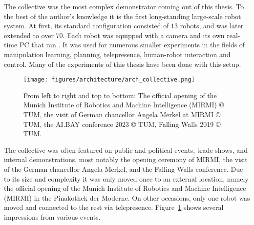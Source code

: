 The collective was the most complex demonstrator coming out of this thesis.
To the best of the author's knowledge it is the first long-standing large-scale robot system.
At first, its standard configuration consisted of $13$ robots, and was later extended to over $70$.
Each robot was equipped with a camera and its own real-time PC that ran \softwareabbr{}.
It was used for numerous smaller experiments in the fields of manipulation learning, planning, telepresence, human-robot interaction and control.
Many of the experiments of this thesis have been done with this setup.

\begin{figure}[ht!]
    \texttt{[image: figures/architecture/arch\_collective.png]}
    \caption{From left to right and top to bottom: The official opening of the Munich Institute of Robotics and Machine Intelligence (MIRMI) \copyright{} TUM, the visit of German chancellor Angela Merkel at MIRMI \copyright{} TUM, the AI.BAY conference 2023 \copyright{} TUM, Falling Walls 2019 \copyright{} TUM.}\label{fig:architecture:learning:collective}
\end{figure}

The collective was often featured on public and political events, trade shows, and internal demonstrations, most notably the opening ceremony of MIRMI, the visit of the German chancellor Angela Merkel, and the Falling Walls conference.
Due to its size and complexity it was only moved once to an external location, namely the official opening of the Munich Institute of Robotics and Machine Intelligence (MIRMI) in the Pinakothek der Moderne.
On other occasions, only one robot was moved and connected to the rest via telepresence.
Figure~\ref{fig:architecture:learning:collective} shows several impressions from various events.

